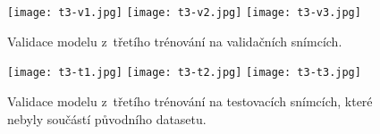 \begin{figure}[H]
    \centering
    \texttt{[image: t3-v1.jpg]}\hfill
    \texttt{[image: t3-v2.jpg]}\hfill
    \texttt{[image: t3-v3.jpg]}
    \caption[Validace modelu z~třetího trénování na validačních snímcích]{Validace modelu z~třetího trénování na validačních snímcích.}
    \label{fig_train3_val_img}
\end{figure}

\begin{figure}[H]
    \centering
    \texttt{[image: t3-t1.jpg]}\hfill
    \texttt{[image: t3-t2.jpg]}\hfill
    \texttt{[image: t3-t3.jpg]}
    \caption[Validace modelu z~třetího trénování na testovacích snímcích]{Validace modelu z~třetího trénování na testovacích snímcích, které nebyly součástí původního datasetu.}
    \label{fig_train3_test_img}
\end{figure}

